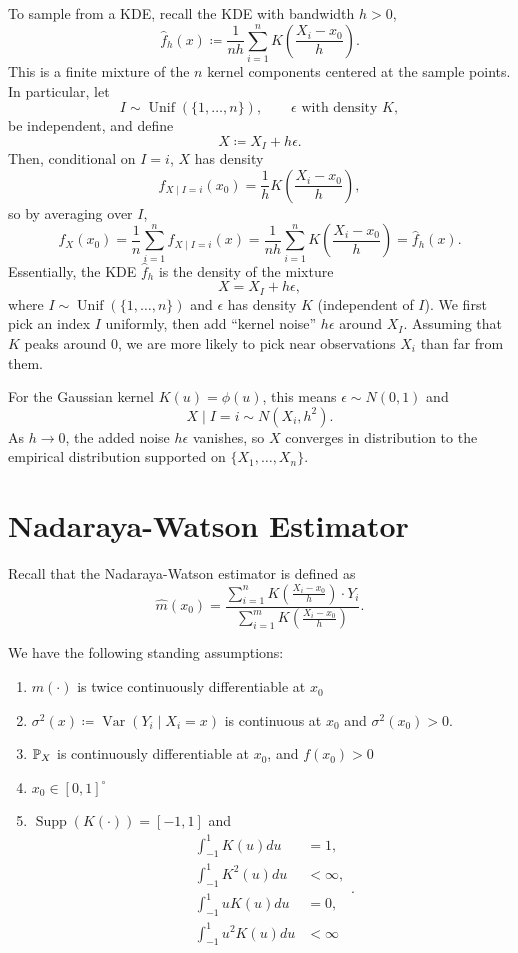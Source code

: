 To sample from a KDE, recall the KDE with bandwidth $h>0$,
\[
	\hat{f}_h(x) \coloneqq \frac{1}{nh}\sum\limits_{i=1}^{n} K\left(\frac{X_i-x_0}{h}\right).
\]
This is a finite mixture of the $n$ kernel components centered at the sample points. In particular, let
\[
	I \sim \operatorname{Unif}\left(\{1,\ldots,n\}\right), 
	\qquad \epsilon \text{ with density } K,
\]
be independent, and define
\[
	X \coloneqq X_I + h\epsilon.
\]
Then, conditional on $I=i$, $X$ has density
\[
	f_{X\mid I=i}(x_0) = \frac{1}{h}K\left(\frac{X_i-x_0}{h}\right),
\]
so by averaging over $I$,
\[
	f_X(x_0) = \frac{1}{n}\sum\limits_{i=1}^{n} f_{X\mid I=i}(x)
	= \frac{1}{nh}\sum\limits_{i=1}^{n} K\left(\frac{X_i-x_0}{h}\right)
	= \hat{f}_h(x).
\]
Essentially, the KDE $\hat{f}_h$ is the density of the mixture
\[
	X = X_I + h\epsilon,
\]
where $I \sim \operatorname{Unif}\left(\{1,\ldots,n\}\right)$ and $\epsilon$ has density $K$ (independent of $I$).
We first pick an index $I$ uniformly, then add ``kernel noise'' $h\epsilon$ around $X_I$.
Assuming that $K$ peaks around $0$, we are more likely to pick near observations $X_i$ than far from them.

For the Gaussian kernel $K(u)=\phi(u)$, this means $\epsilon \sim N(0,1)$ and
\[
	X\mid I=i \sim N\left(X_i,h^2\right).
\]
As $h \to 0$, the added noise $h\epsilon$ vanishes, so $X$ converges in distribution to the empirical distribution supported on $\{X_1,\ldots,X_n\}$.

\section{Nadaraya-Watson Estimator}


Recall that the Nadaraya-Watson estimator is defined as \[
	\hat{m}(x_0) = \frac{\sum\limits_{i=1}^{n} K\left( \frac{X_i - x_0}{h} \right) \cdot  Y_i}{\sum\limits_{i=1}^{m} K\left( \frac{X_i - x_0}{h} \right)}
.\] 

We have the following standing assumptions:
\begin{enumerate}[label=(\roman*)]
	\item $m(\cdot )$ is twice continuously differentiable at $x_0$
	\item $\sigma^2(x) \coloneqq \operatorname{Var}\left(Y_i \mid X_i = x\right)$ is continuous at $x_0$ and $\sigma^2(x_0) > 0$.
	\item $\P_X$ is continuously differentiable at $x_0$, and $f(x_0) > 0$
	\item $x_0 \in [0,1]^{\circ}$
	\item $\operatorname{Supp}(K(\cdot )) = [-1,1]$ and \[
				\begin{aligned}
					\int_{-1}^{1} K(u)du &= 1, \\
					\int_{-1}^{1} K^2(u)du &< \infty, \\
					\int_{-1}^{1} u K(u)du &= 0, \\
					\int_{-1}^{1} u^2 K(u)du &< \infty
				\end{aligned}
		.\] 
\end{enumerate}

